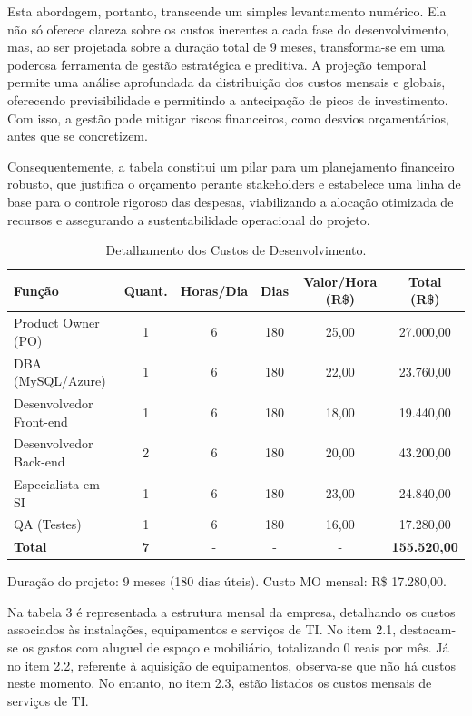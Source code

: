 \documentclass[
	12pt,				%
	openany,			%
	twoside,			%
	a4paper,			%
	english,			%
	brazil				%
	]{abntex2}
\begin{document}
Esta abordagem, portanto, transcende um simples levantamento numérico. Ela não só oferece clareza sobre os custos inerentes a cada fase do desenvolvimento, mas, ao ser projetada sobre a duração total de 9 meses, transforma-se em uma poderosa ferramenta de gestão estratégica e preditiva. A projeção temporal permite uma análise aprofundada da distribuição dos custos mensais e globais, oferecendo previsibilidade e permitindo a antecipação de picos de investimento. Com isso, a gestão pode mitigar riscos financeiros, como desvios orçamentários, antes que se concretizem.

Consequentemente, a tabela constitui um pilar para um planejamento financeiro robusto, que justifica o orçamento perante stakeholders e estabelece uma linha de base para o controle rigoroso das despesas, viabilizando a alocação otimizada de recursos e assegurando a sustentabilidade operacional do projeto.

\begin{table}[hbtp]
    \centering
    \caption{Detalhamento dos Custos de Desenvolvimento.}
    \label{tab:custos_desenvolvimento_simples}
    \begin{tabular}{|l|c|c|c|c|c|}
        \hline
        \textbf{Função} & \textbf{Quant.} & \textbf{Horas/Dia} & \textbf{Dias} & \textbf{Valor/Hora (R\$)} & \textbf{Total (R\$)} \\
        \hline
        Product Owner (PO)    & 1 & 6 & 180 & 25,00 & 27.000,00 \\
        \hline
        DBA (MySQL/Azure)     & 1 & 6 & 180 & 22,00 & 23.760,00 \\
        \hline
        Desenvolvedor Front-end & 1 & 6 & 180 & 18,00 & 19.440,00 \\
        \hline
        Desenvolvedor Back-end  & 2 & 6 & 180 & 20,00 & 43.200,00 \\
        \hline
        Especialista em SI    & 1 & 6 & 180 & 23,00 & 24.840,00 \\
        \hline
        QA (Testes)           & 1 & 6 & 180 & 16,00 & 17.280,00 \\
        \hline
        \textbf{Total} & \textbf{7} & - & - & - & \textbf{155.520,00} \\
        \hline
    \end{tabular}
    Duração do projeto: 9 meses (180 dias úteis). Custo MO mensal: R\$ 17.280,00.
\end{table}

Na tabela 3 é representada a estrutura mensal da empresa, detalhando os custos associados às instalações, equipamentos e serviços de TI. No item 2.1, destacam-se os gastos com aluguel de espaço e mobiliário, totalizando 0 reais por mês. Já no item 2.2, referente à aquisição de equipamentos, observa-se que não há custos neste momento. No entanto, no item 2.3, estão listados os custos mensais de serviços de TI.
\end{document}
